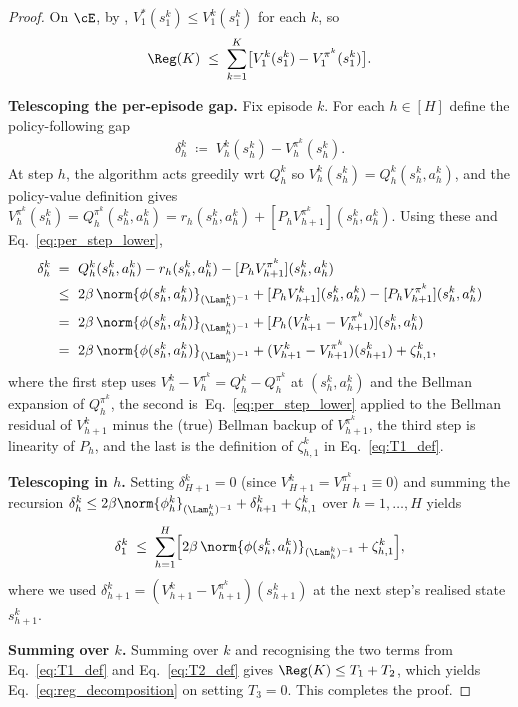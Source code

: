 \begin{proof}
On $\cE$, by , $V_1^*(s_1^k) \le V_1^k(s_1^k)$ for each $k$, so
\begin{align*}
\Reg(K) \;\le\; \sum_{k=1}^K \bigl[ V_1^k(s_1^k) - V_1^{\pi^k}(s_1^k) \bigr].
\end{align*}

\smallskip\noindent
\textbf{Telescoping the per-episode gap.} Fix episode $k$. For each $h \in [H]$ define the policy-following gap
\begin{align*}
\delta_h^k \;\coloneqq\; V_h^k(s_h^k) - V_h^{\pi^k}(s_h^k).
\end{align*}
At step $h$, the algorithm acts greedily wrt $Q_h^k$ so $V_h^k(s_h^k) = Q_h^k(s_h^k, a_h^k)$, and the policy-value definition gives $V_h^{\pi^k}(s_h^k) = Q_h^{\pi^k}(s_h^k, a_h^k) = r_h(s_h^k, a_h^k) + [P_h V_{h+1}^{\pi^k}](s_h^k, a_h^k)$. Using these and \,Eq.~\eqref{eq:per_step_lower},
\begin{align*}
\delta_h^k
\;=\; & ~ Q_h^k(s_h^k, a_h^k) - r_h(s_h^k, a_h^k) - [P_h V_{h+1}^{\pi^k}](s_h^k, a_h^k) \\
\;\le\; & ~ 2 \beta\, \norm{\phi(s_h^k, a_h^k)}_{(\Lam_h^k)^{-1}} + [P_h V_{h+1}^k](s_h^k, a_h^k) - [P_h V_{h+1}^{\pi^k}](s_h^k, a_h^k) \\
\;=\; & ~ 2 \beta\, \norm{\phi(s_h^k, a_h^k)}_{(\Lam_h^k)^{-1}} + [P_h (V_{h+1}^k - V_{h+1}^{\pi^k})](s_h^k, a_h^k) \\
\;=\; & ~ 2 \beta\, \norm{\phi(s_h^k, a_h^k)}_{(\Lam_h^k)^{-1}} + (V_{h+1}^k - V_{h+1}^{\pi^k})(s_{h+1}^k) + \zeta_{h, 1}^k,
\end{align*}
where the first step uses $V_h^k - V_h^{\pi^k} = Q_h^k - Q_h^{\pi^k}$ at $(s_h^k, a_h^k)$ and the Bellman expansion of $Q_h^{\pi^k}$, the second is \,Eq.~\eqref{eq:per_step_lower} applied to the Bellman residual of $V_{h+1}^k$ minus the (true) Bellman backup of $V_{h+1}^{\pi^k}$, the third step is linearity of $P_h$, and the last is the definition of $\zeta_{h, 1}^k$ in Eq.~\eqref{eq:T1_def}.

\smallskip\noindent
\textbf{Telescoping in $h$.} Setting $\delta_{H+1}^k = 0$ (since $V_{H+1}^k = V_{H+1}^{\pi^k} \equiv 0$) and summing the recursion $\delta_h^k \le 2 \beta \norm{\phi_h^k}_{(\Lam_h^k)^{-1}} + \delta_{h+1}^k + \zeta_{h, 1}^k$ over $h = 1, \ldots, H$ yields
\begin{align*}
\delta_1^k \;\le\; \sum_{h=1}^H \Bigl[ 2 \beta\, \norm{\phi(s_h^k, a_h^k)}_{(\Lam_h^k)^{-1}} + \zeta_{h, 1}^k \Bigr],
\end{align*}
where we used $\delta_{h+1}^k = (V_{h+1}^k - V_{h+1}^{\pi^k})(s_{h+1}^k)$ at the next step's realised state $s_{h+1}^k$.

\smallskip\noindent
\textbf{Summing over $k$.} Summing over $k$ and recognising the two terms from Eq.~\eqref{eq:T1_def} and Eq.~\eqref{eq:T2_def} gives $\Reg(K) \le T_1 + T_2$, which yields Eq.~\eqref{eq:reg_decomposition} on setting $T_3 = 0$. This completes the proof.
\end{proof}

